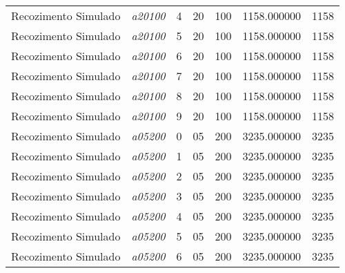 {\begin{longtable}{cc|c|cc|cc}
			Recozimento Simulado & \textit{a20100}    & 4                               & 20               & 100              & 1158.000000                          & 1158 \\ 
			Recozimento Simulado & \textit{a20100}    & 5                               & 20               & 100              & 1158.000000                          & 1158 \\ 
			Recozimento Simulado & \textit{a20100}    & 6                               & 20               & 100              & 1158.000000                          & 1158 \\ 
			Recozimento Simulado & \textit{a20100}    & 7                               & 20               & 100              & 1158.000000                          & 1158 \\ 
			Recozimento Simulado & \textit{a20100}    & 8                               & 20               & 100              & 1158.000000                          & 1158 \\ 
			Recozimento Simulado & \textit{a20100}    & 9                               & 20               & 100              & 1158.000000                          & 1158 \\ \hline
			Recozimento Simulado & \textit{a05200}    & 0                               & 05               & 200              & 3235.000000                          & 3235 \\ 
			Recozimento Simulado & \textit{a05200}    & 1                               & 05               & 200              & 3235.000000                          & 3235 \\ 
			Recozimento Simulado & \textit{a05200}    & 2                               & 05               & 200              & 3235.000000                          & 3235 \\ 
			Recozimento Simulado & \textit{a05200}    & 3                               & 05               & 200              & 3235.000000                          & 3235 \\ 
			Recozimento Simulado & \textit{a05200}    & 4                               & 05               & 200              & 3235.000000                          & 3235 \\ 
			Recozimento Simulado & \textit{a05200}    & 5                               & 05               & 200              & 3235.000000                          & 3235 \\ 
			Recozimento Simulado & \textit{a05200}    & 6                               & 05               & 200              & 3235.000000                          & 3235 \\ 

\end{longtable}}
